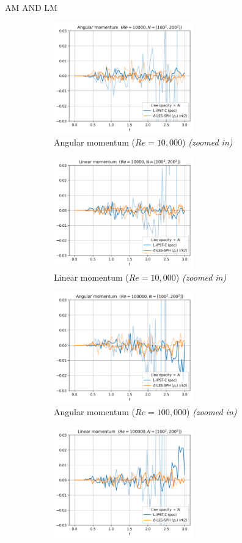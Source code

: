 AM AND LM 
\begin{figure}[htbp!]
  \begin{subfigure}{7cm}
  \centering\includegraphics[width=6cm]{Code-Figures/ext-force-tgv/limit_am_re_10000.png}
  \caption{Angular momentum ($Re = 10,000$) \textit{(zoomed in)}}
  \end{subfigure}
  \begin{subfigure}{7cm}
  \centering\includegraphics[width=6cm]{Code-Figures/ext-force-tgv/limit_lm_re_10000.png}
  \caption{Linear momentum ($Re = 10,000$) \textit{(zoomed in)}}
  \end{subfigure}
  \begin{subfigure}{7cm}
  \centering\includegraphics[width=6cm]{Code-Figures/ext-force-tgv/limit_am_re_100000.png}
  \caption{Angular momentum ($Re = 100,000$) \textit{(zoomed in)}}
  \end{subfigure}
  \begin{subfigure}{7cm}
  \centering\includegraphics[width=6cm]{Code-Figures/ext-force-tgv/limit_lm_re_100000.png}

\end{subfigure}
\end{figure}
